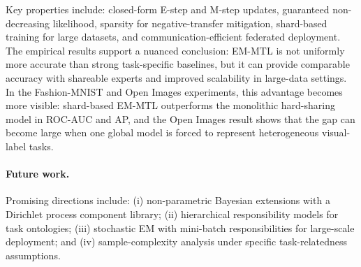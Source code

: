 \documentclass[preprint,12pt]{elsarticle}
\begin{document}
	Key properties include: closed-form E-step and M-step updates,
	guaranteed non-decreasing likelihood, sparsity for negative-transfer
	mitigation, shard-based training for large datasets, and
	communication-efficient federated deployment. The empirical results
	support a nuanced conclusion: EM-MTL is not uniformly more accurate than
	strong task-specific baselines, but it can provide comparable accuracy
	with shareable experts and improved scalability in large-data settings.
	In the Fashion-MNIST and Open Images experiments, this advantage becomes
	more visible: shard-based EM-MTL outperforms the monolithic
	hard-sharing model in ROC-AUC and AP, and the Open Images result shows
	that the gap can become large when one global model is forced to
	represent heterogeneous visual-label tasks.
	
	\paragraph{Future work.}
	Promising directions include: (i) non-parametric Bayesian extensions
	with a Dirichlet process component library; (ii) hierarchical
	responsibility models for task ontologies; (iii) stochastic EM with
	mini-batch responsibilities for large-scale deployment; and (iv)
	sample-complexity analysis under specific task-relatedness assumptions.
	
	
	
	
\end{document}

